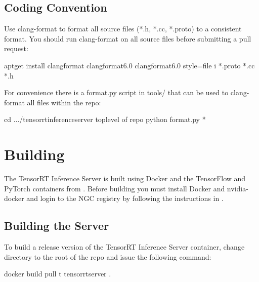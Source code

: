 \documentclass[letterpaper,10pt,english]{sphinxmanual}
\begin{document}
\section{Coding Convention}
\label{\detokenize{contribute:coding-convention}}
Use clang-format to format all source files (*.h, *.cc, *.proto) to
a consistent format. You should run clang-format on all source files
before submitting a pull request:

\begin{sphinxVerbatim}[commandchars=\\\{\}]
\PYGZdl{} apt\PYGZhy{}get install clang\PYGZhy{}format clang\PYGZhy{}format\PYGZhy{}6.0
\PYGZdl{} clang\PYGZhy{}format\PYGZhy{}6.0 \PYGZhy{}\PYGZhy{}style=file \PYGZhy{}i *.proto *.cc *.h
\end{sphinxVerbatim}

For convenience there is a format.py script in tools/ that can be used
to clang-format all files within the repo:

\begin{sphinxVerbatim}[commandchars=\\\{\}]
\PYGZdl{} cd .../tensorrt\PYGZhy{}inference\PYGZhy{}server    \PYGZsh{} top\PYGZhy{}level of repo
\PYGZdl{} python format.py *
\end{sphinxVerbatim}


\chapter{Building}
\label{\detokenize{build:building}}\label{\detokenize{build::doc}}
The TensorRT Inference Server is built using Docker and the TensorFlow
and PyTorch containers from . Before building you must install Docker
and nvidia-docker and login to the NGC registry by following the
instructions in {\hyperref[\detokenize{install:section-installing-prebuilt-containers}]{}}.


\section{Building the Server}
\label{\detokenize{build:building-the-server}}\label{\detokenize{build:section-building-the-server}}
To build a release version of the TensorRT Inference Server container,
change directory to the root of the repo and issue the following
command:

\begin{sphinxVerbatim}[commandchars=\\\{\}]
\PYGZdl{} docker build \PYGZhy{}\PYGZhy{}pull \PYGZhy{}t tensorrtserver .
\end{sphinxVerbatim}
\end{document}
